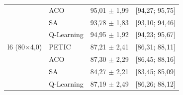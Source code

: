 \begin{table}[htb]
\begin{tabular}{llcc}
         & ACO & 95,01 $\pm$ 1,99 & [94,27; 95,75] \\
         & SA & 93,78 $\pm$ 1,83 & [93,10; 94,46] \\
         & Q-Learning & 94,95 $\pm$ 1,92 & [94,23; 95,67] \\
        \hline
        l6 (80$\times$4,0) & PETIC & 87,21 $\pm$ 2,41 & [86,31; 88,11] \\
         & ACO & 87,30 $\pm$ 2,29 & [86,45; 88,16] \\
         & SA & 84,27 $\pm$ 2,21 & [83,45; 85,09] \\
         & Q-Learning & 87,19 $\pm$ 2,49 & [86,26; 88,12] \\
        \hline
    \end{tabular}
\end{table}
